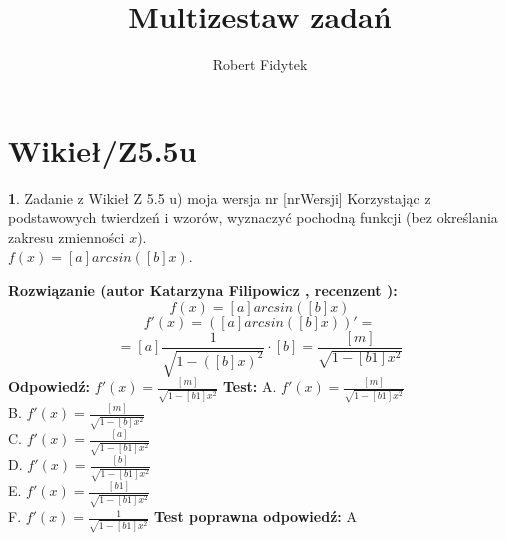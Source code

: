 \documentclass[12pt, a4paper]{article}
\title{Multizestaw zadań}
\author{Robert Fidytek}
\date{}
\theoremstyle{definition} %
\newtheorem{zad}{}
\newcommand{\kategoria}[1]{\section{#1}} %
\newcommand{\zadStart}[1]{\begin{zad}#1\newline} %
\newcommand{\zadStop}{\end{zad}}   %
\newcommand{\rozwStart}[2]{\noindent \textbf{Rozwiązanie (autor #1 , recenzent #2): }\newline} %
\newcommand{\rozwStop}{\newline}                                            %
\newcommand{\odpStart}{\noindent \textbf{Odpowiedź:}\newline}    %
\newcommand{\odpStop}{\newline}                                             %
\newcommand{\testStart}{\noindent \textbf{Test:}\newline} %
\newcommand{\testStop}{\newline} %
\newcommand{\kluczStart}{\noindent \textbf{Test poprawna odpowiedź:}\newline} %
\newcommand{\kluczStop}{\newline} %
\begin{document}
\maketitle


\kategoria{Wikieł/Z5.5u}
\zadStart{Zadanie z Wikieł Z 5.5 u) moja wersja nr [nrWersji]}
Korzystając z podstawowych twierdzeń i wzorów, wyznaczyć pochodną funkcji (bez określania zakresu zmienności $x$).\\ 
$f(x)=[a]arcsin([b]x)$.
\zadStop
\rozwStart{Katarzyna Filipowicz}{}
$$f(x)=[a]arcsin([b]x)$$
$$f'(x)=\left([a]arcsin([b]x)\right)' = $$
$$ = [a]\frac{1}{\sqrt{1-([b]x)^2}}\cdot[b]=\frac{[m]}{\sqrt{1-[b1]x^2}}
$$
\rozwStop
\odpStart
$ f'(x)=\frac{[m]}{\sqrt{1-[b1]x^2}}$
\odpStop
\testStart
A. $ f'(x)=\frac{[m]}{\sqrt{1-[b1]x^2}}$\\
B. $ f'(x)=\frac{[m]}{\sqrt{1-[b]x^2}}$\\
C. $ f'(x)=\frac{[a]}{\sqrt{1-[b1]x^2}}$ \\
D. $ f'(x)=\frac{[b]}{\sqrt{1-[b1]x^2}}$\\
E. $ f'(x)=\frac{[b1]}{\sqrt{1-[b1]x^2}}$\\
F. $ f'(x)=\frac{1}{\sqrt{1-[b1]x^2}}$
\testStop
\kluczStart
A
\kluczStop
\end{document}
